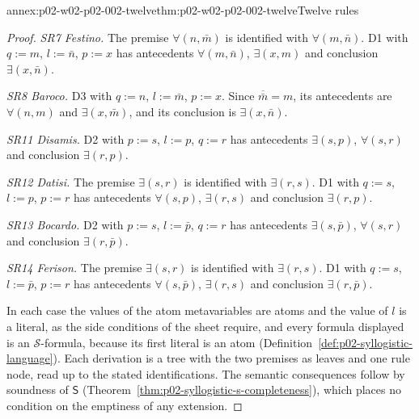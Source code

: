 \begin{annexitem}{annex:p02-w02-p02-002-twelve}{thm:p02-w02-p02-002-twelve}{Twelve rules}
\begin{proof}
\emph{SR7 Festino.} The premise \(\forall(n,\bar m)\) is identified with
\(\forall(m,\bar n)\). D1 with \(q:=m\), \(l:=\bar n\), \(p:=x\) has
antecedents \(\forall(m,\bar n)\), \(\exists(x,m)\) and conclusion
\(\exists(x,\bar n)\).

\emph{SR8 Baroco.} D3 with \(q:=n\), \(l:=\bar m\), \(p:=x\). Since
\(\overline{\bar m}=m\), its antecedents are \(\forall(n,m)\) and
\(\exists(x,\bar m)\), and its conclusion is \(\exists(x,\bar n)\).

\emph{SR11 Disamis.} D2 with \(p:=s\), \(l:=p\), \(q:=r\) has antecedents
\(\exists(s,p)\), \(\forall(s,r)\) and conclusion \(\exists(r,p)\).

\emph{SR12 Datisi.} The premise \(\exists(s,r)\) is identified with
\(\exists(r,s)\). D1 with \(q:=s\), \(l:=p\), \(p:=r\) has antecedents
\(\forall(s,p)\), \(\exists(r,s)\) and conclusion \(\exists(r,p)\).

\emph{SR13 Bocardo.} D2 with \(p:=s\), \(l:=\bar p\), \(q:=r\) has
antecedents \(\exists(s,\bar p)\), \(\forall(s,r)\) and conclusion
\(\exists(r,\bar p)\).

\emph{SR14 Ferison.} The premise \(\exists(s,r)\) is identified with
\(\exists(r,s)\). D1 with \(q:=s\), \(l:=\bar p\), \(p:=r\) has antecedents
\(\forall(s,\bar p)\), \(\exists(r,s)\) and conclusion \(\exists(r,\bar p)\).

In each case the values of the atom metavariables are atoms and the value
of \(l\) is a literal, as the side conditions of the sheet require, and every
formula displayed is an \(\mathcal S\)-formula, because its first literal is
an atom (Definition~\ref{def:p02-syllogistic-language}). Each derivation is a
tree with the two premises as leaves and one rule node, read up to the
stated identifications. The semantic consequences follow by soundness of
\(\mathsf S\) (Theorem~\ref{thm:p02-syllogistic-s-completeness}), which
places no condition on the emptiness of any extension.
\end{proof}
\end{annexitem}

